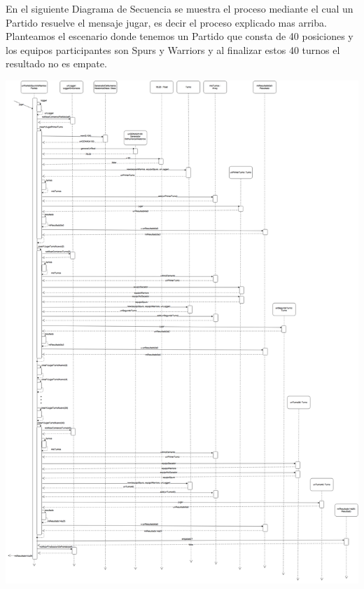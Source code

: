 En el siguiente Diagrama de Secuencia se muestra el proceso mediante el cual un Partido resuelve el mensaje jugar, es decir el proceso explicado mas arriba. Planteamos el escenario donde tenemos un Partido que consta de 40 posiciones y los equipos participantes son Spurs y Warriors y al finalizar estos 40 turnos el resultado no es empate.

\begin{center}
  \includegraphics[scale=0.24]{imagenes/partido-jugar-secuencia.png}
\end{center}
